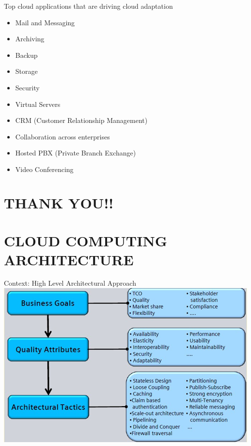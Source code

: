 \documentclass{SKP-beamer}
\begin{document}
\begin{frame}{Top cloud applications that are driving cloud adaptation}
	\begin{itemize}
		\item Mail and Messaging
		\item Archiving
		\item Backup
		\item Storage
		\item Security
		\item Virtual Servers
		\item CRM (Customer Relationship Management)
		\item Collaboration across enterprises
		\item Hosted PBX (Private Branch Exchange)
		\item Video Conferencing
		
	\end{itemize}
\end{frame}

\section{\textbf{THANK YOU!!}}

\section{\textbf{CLOUD COMPUTING ARCHITECTURE}}

\begin{frame}{Context: High Level Architectural Approach}
	\includegraphics[scale=0.9]{f.png}
\end{frame}
\end{document}
